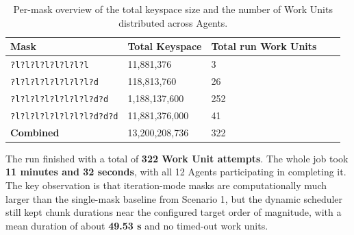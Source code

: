 \begin{table}[hbt]
    \centering
    \caption{Per-mask overview of the total keyspace size and the number of Work Units distributed across Agents.}
    \label{tab:scenario2_mask_overview}
    \footnotesize
    \begin{tabular}{|l|l|l|l|l|}
        \hline
         \textbf{Mask} & \textbf{Total Keyspace} & \textbf{Total run Work Units} \\ \hline
         \verb|?l?l?l?l?l?l?l?l| & 11,881,376 & 3 \\ \hline
         \verb|?l?l?l?l?l?l?l?l?d| & 118,813,760 & 26 \\ \hline
         \verb|?l?l?l?l?l?l?l?l?d?d| & 1,188,137,600 & 252 \\ \hline
         \verb|?l?l?l?l?l?l?l?l?d?d?d| & 11,881,376,000 & 41 \\ \hline
         \textbf{Combined} & 13,200,208,736 & 322 \\ \hline
    \end{tabular}
\end{table}

The run finished with a total of \textbf{322 Work Unit attempts}. The whole job took \textbf{11 minutes and 32 seconds}, with all 12 Agents participating in completing it. The key observation is that iteration-mode masks are computationally much larger than the single-mask baseline from Scenario 1, but the dynamic scheduler still kept chunk durations near the configured target order of magnitude, with a mean duration of about \textbf{49.53 s} and no timed-out work units.

